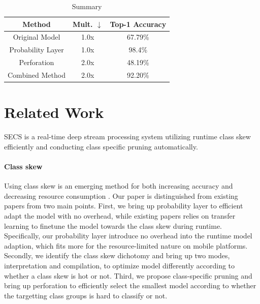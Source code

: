 \documentclass[pageno]{jpaper}
\begin{document}



\begin{table}[h]
    \caption{Summary}
    \label{tab:my_label}

    \centering
    \begin{tabular}{ ccc } 
     Method & Mult. $\downarrow$ & Top-1 Accuracy \\ 
     \hline
     Original Model & 1.0x & 67.79\% \\
     Probability Layer & 1.0x & 98.4\% \\ 
     Perforation & 2.0x & 48.19\% \\ 
     \hline
     Combined Method & 2.0x & 92.20\%
    \end{tabular}
\end{table}


\newpage
\clearpage
\section{Related Work} \label{relatedWork}
SECS is a real-time deep stream processing system utilizing runtime class skew efficiently and conducting class specific pruning automatically.

\paragraph{Class skew}
Using class skew is an emerging method for both increasing accuracy and decreasing resource consumption \cite{han2016mcdnn, kang2017noscope, shen2016fast}. Our paper is distinguished from existing papers from two main points. First, we bring up probability layer to efficient adapt the model with no overhead, while existing papers relies on transfer learning to finetune the model towards the class skew during runtime. Specifically, our probability layer introduce no overhead into the runtime model adaption, which fits more for the resource-limited nature on mobile platforms. Secondly, we identify the class skew dichotomy and bring up two modes, interpretation and compilation, to optimize model differently according to whether a class skew is hot or not. Third, we propose class-specific pruning and bring up perforation to efficiently select the smallest model according to whether the targetting class groups is hard to classify or not.


\end{document}
